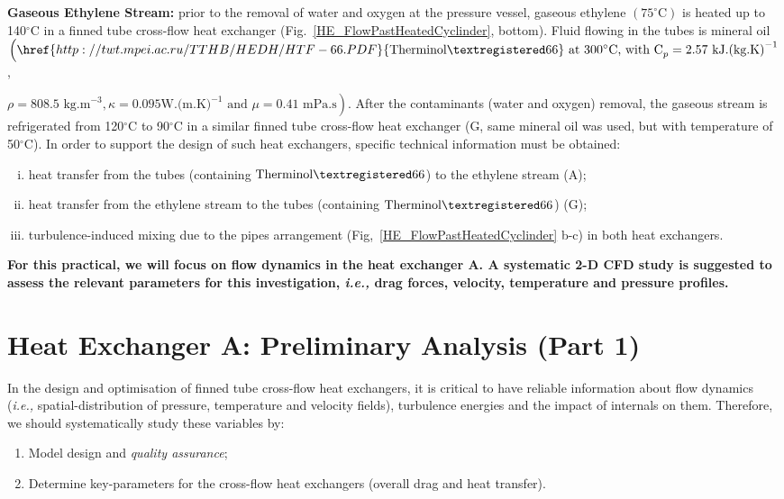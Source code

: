 \documentclass[12pts,a4paper,amsmath,amssymb,floatfix]{article}%
\newcommand{\ie}{{\it i.e., }}
\begin{document}
{\bf Gaseous Ethylene Stream:} prior to the removal of water and oxygen at the pressure vessel, gaseous ethylene $\left(\text{75}^{\circ}\text{C}\right)$ is heated up to 140$^{\circ}$C in a finned tube cross-flow heat exchanger (Fig.~\ref{HE_FlowPastHeatedCyclinder}, bottom). Fluid flowing in the tubes is mineral oil $\left(\href{http://twt.mpei.ac.ru/TTHB/HEDH/HTF-66.PDF}{\text{Therminol}\textregistered\text{66}} \text{ at 300}^{\circ}\text{C, with C}_{p}=2.57\text{ kJ.(kg.K)}^{-1}\right.$,

$\left.\rho= 808.5\text{ kg.m}^{-3}, \kappa=0.095\text{W.(m.K)}^{-1}\text{ and }\mu=0.41\text{ mPa.s}\right)$. After the contaminants (water and oxygen) removal, the gaseous stream is refrigerated from 120$^{\circ}$C to 90$^{\circ}$C in a similar finned tube cross-flow heat exchanger (G, same mineral oil was used, but with temperature of 50$^{\circ}$C).  In order to support the design of such heat exchangers, specific technical information must be obtained:
     \begin{enumerate}[i)]
        \item heat transfer from the tubes (containing $\text{Therminol}\textregistered\text{66}$) to the ethylene stream (A);
        \item heat transfer from the ethylene stream to the tubes (containing $\text{Therminol}\textregistered\text{66}$) (G);
        \item turbulence-induced mixing due to the pipes arrangement (Fig,~\ref{HE_FlowPastHeatedCyclinder} b-c) in both heat exchangers.
     \end{enumerate}

     {\bf For this practical, we will focus on flow dynamics in the heat exchanger A. A systematic 2-D CFD study is suggested to assess the relevant parameters for this investigation, \ie drag forces, velocity, temperature and pressure profiles.}

     \section{Heat Exchanger A: Preliminary Analysis (Part 1)}
     In the design and optimisation of finned tube cross-flow heat exchangers, it is critical to have reliable information about flow dynamics (\ie spatial-distribution of pressure, temperature and velocity fields), turbulence energies and the impact of internals on them. Therefore, we should systematically study these variables by:
     \begin{enumerate}
       \item Model design and {\it quality assurance};
       \item Determine key-parameters for the cross-flow heat exchangers (overall drag and heat transfer).
     \end{enumerate}
\end{document}
